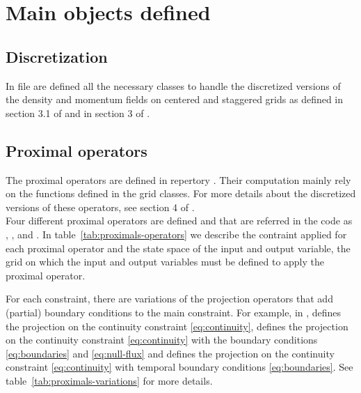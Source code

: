 
\section{Main objects defined}
\noindent

    \subsection{Discretization}
    \noindent

        In file  are defined all the necessary classes to handle the discretized versions of
        the density and momentum fields on centered and staggered grids as defined in section 3.1 of \cite{farchi-2016} and in section 3 of
        \cite{papadakis-2014}.

    \subsection{Proximal operators}
    \noindent

        The proximal operators are defined in repertory . Their computation mainly rely on the functions
        defined in the grid classes. For more details about the discretized versions of these operators, see section 4 of
        \cite{papadakis-2014}.\\

        Four different proximal operators are defined and
        that are referred in the code as , ,  and .
        In table~\ref{tab:proximals-operators} we describe the contraint applied for each proximal operator and the state space
        of the input and output variable, \ie{} the grid on which the input and output variables must be defined to
        apply the proximal operator.

         

        For each constraint, there are variations of
        the projection operators that add (partial) boundary conditions to the main constraint.
        For example, in ,  defines
        the projection on the continuity constraint \eqref{eq:continuity},  defines the projection on the continuity constraint 
        \eqref{eq:continuity} with the boundary conditions \eqref{eq:boundaries} and \eqref{eq:null-flux} and
         defines the projection on the continuity constraint \eqref{eq:continuity} with temporal boundary conditions
        \eqref{eq:boundaries}.
        See table~\ref{tab:proximals-variations} for more details.

